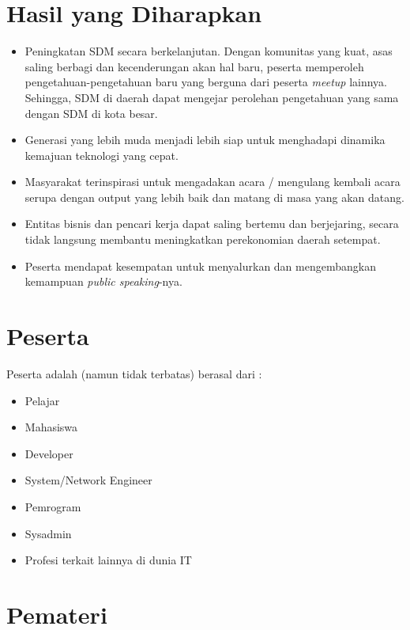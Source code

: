 \documentclass{article}
\begin{document}
\section{Hasil yang Diharapkan}
\begin{itemize}
  \item Peningkatan SDM secara berkelanjutan. Dengan komunitas yang kuat, asas saling berbagi dan kecenderungan akan hal baru, peserta memperoleh pengetahuan-pengetahuan baru yang berguna dari peserta \textit{meetup} lainnya. Sehingga, SDM di daerah dapat mengejar perolehan pengetahuan yang sama dengan SDM di kota besar.
  \item Generasi yang lebih muda menjadi lebih siap untuk menghadapi dinamika kemajuan teknologi yang cepat. 
  \item Masyarakat terinspirasi untuk mengadakan acara / mengulang kembali acara serupa dengan output yang lebih baik dan matang di masa yang akan datang.
  \item Entitas bisnis dan pencari kerja dapat saling bertemu dan berjejaring, secara tidak langsung membantu meningkatkan perekonomian daerah setempat.
  \item Peserta mendapat kesempatan untuk menyalurkan dan mengembangkan kemampuan \textit{public speaking}-nya.
\end{itemize}

\section{Peserta}

Peserta adalah (namun tidak terbatas) berasal dari :

\begin{itemize}
  \item Pelajar
  \item Mahasiswa
  \item Developer
  \item System/Network Engineer
  \item Pemrogram
  \item Sysadmin
  \item Profesi terkait lainnya di dunia IT
\end{itemize}

\section{Pemateri}
\end{document}
